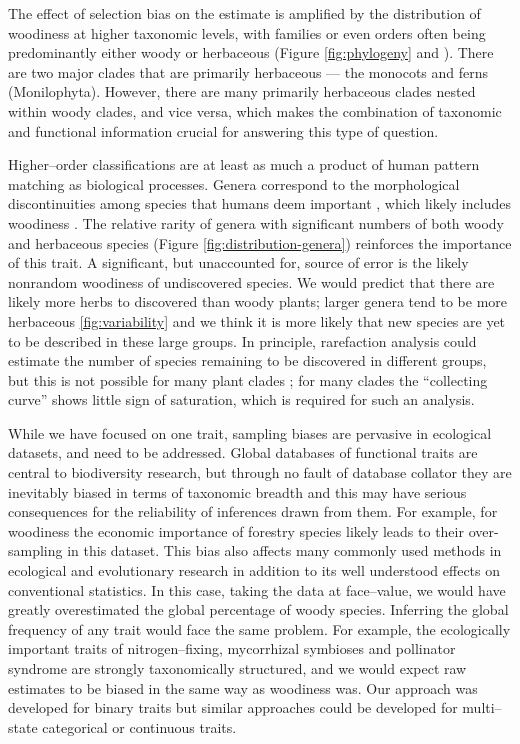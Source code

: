 \documentclass[a4paper,12pt]{article}
\begin{document}
The effect of selection bias on the estimate is amplified by the distribution of woodiness at higher
taxonomic levels, with families or even orders often being
predominantly either woody or herbaceous (Figure \ref{fig:phylogeny} and
\citealt{sinnott1915evolution}).  There are two major clades that are
primarily herbaceous --- the monocots and ferns
(Monilophyta). However, there are many primarily herbaceous clades
nested within woody clades, and vice versa, which makes the
combination of taxonomic and functional information crucial for
answering this type of question.  

Higher--order classifications are at least as much a product of human
pattern matching as biological processes.  Genera correspond to the
morphological discontinuities among species that humans deem important
\citep{scotland2004significance}, which likely includes woodiness
\citep[e.g.,][]{Hutchinson}.  The relative rarity of genera with
significant numbers of both woody and herbaceous species (Figure
\ref{fig:distribution-genera}) reinforces the importance of this
trait.  A significant, but unaccounted for, source of error is the likely
nonrandom woodiness of undiscovered species. We would predict that
there are likely more herbs to discovered than woody plants; larger genera
tend to be more herbaceous \ref{fig:variability} and we think it is more
likely that new species are yet to be described in these large groups.  In principle,
rarefaction analysis could estimate the number of species remaining to
be discovered in different groups, but this is not possible for many
plant clades \citep{costello2011}; for many clades the ``collecting curve'' 
shows little sign of saturation, which is required for such an analysis.

While we have focused on one trait, sampling biases are pervasive in ecological datasets, and need to be addressed.
Global databases of functional traits
\citep[e.g., TRY;][]{kattge2011try} are central to biodiversity
research, but through no fault of database collator they are inevitably biased in terms of taxonomic breadth
and this may have serious consequences for the reliability of
inferences drawn from them.
For example, for woodiness the economic importance of forestry species
likely leads to their
over-sampling in this dataset.
This bias also affects many commonly used methods in ecological and evolutionary research 
\citep[e.g.,][]{ackerly2000taxon,nakagawa2008missing,pennell2013integrative, Pakeman2013} in addition to its well understood effects on conventional statistics. 
In this case, taking the data at face--value, 
we would have greatly overestimated
the global percentage of woody species.  Inferring the global
frequency of any trait would face the same problem.  For
example, the ecologically important traits of nitrogen--fixing,
mycorrhizal symbioses and pollinator syndrome are strongly
taxonomically structured, and we would expect raw estimates to be
biased in the same way as woodiness was.  Our approach was developed
for binary traits
but similar approaches could be developed for multi--state categorical or continuous traits.
\end{document}
